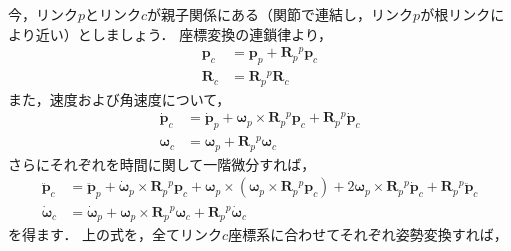 ﻿\documentclass[a4paper]{jsarticle}
\begin{document}
今，リンク$p$とリンク$c$が親子関係にある（関節で連結し，リンク$p$が根リンクにより近い）としましょう．
座標変換の連鎖律より，
\begin{align}
\bm{p}_{c}&=\bm{p}_{p}+\bm{R}_{p}{}^{p}\bm{p}_{c}
\label{eq:position} \\
\bm{R}_{c}&=\bm{R}_{p}{}^{p}\bm{R}_{c}
\label{eq:attitude}
\end{align}
また，速度および角速度について，
\begin{align}
\dot{\bm{p}}_{c}&=\dot{\bm{p}}_{p}
 +\bm{\omega}_{p}\times\bm{R}_{p}{}^{p}\bm{p}_{c}
 +\bm{R}_{p}{}^{p}\dot{\bm{p}}_{c}
\label{eq:lin_vel} \\
\bm{\omega}_{c}&=\bm{\omega}_{p}+\bm{R}_{p}{}^{p}\bm{\omega}_{c}
\label{eq:ang_vel}
\end{align}
さらにそれぞれを時間に関して一階微分すれば，
\begin{align}
\ddot{\bm{p}}_{c}&=\ddot{\bm{p}}_{p}
 +\dot{\bm{\omega}}_{p}\times\bm{R}_{p}{}^{p}\bm{p}_{c}
 +\bm{\omega}_{p}\times(\bm{\omega}_{p}\times\bm{R}_{p}{}^{p}\bm{p}_{c})
 +2\bm{\omega}_{p}\times\bm{R}_{p}{}^{p}\dot{\bm{p}}_{c}
 +\bm{R}_{p}{}^{p}\ddot{\bm{p}}_{c}
\label{eq:lin_acc} \\
\dot{\bm{\omega}}_{c}&=\dot{\bm{\omega}}_{p}
 +\bm{\omega}_{p}\times\bm{R}_{p}{}^{p}\bm{\omega}_{c}
 +\bm{R}_{p}{}^{p}\dot{\bm{\omega}}_{c}
\label{eq:ang_acc}
\end{align}
を得ます．
上の式を，全てリンク$c$座標系に合わせてそれぞれ姿勢変換すれば，
\end{document}

